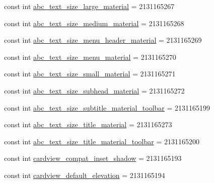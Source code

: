 \begin{DoxyCompactItemize}
\item 
const int \mbox{\hyperlink{class_f_w_p_s___app_1_1_droid_1_1_resource_1_1_dimension_a19d4f305b404ba1b44bd537cd5a9b904}{abc\+\_\+text\+\_\+size\+\_\+large\+\_\+material}} = 2131165267
\item 
const int \mbox{\hyperlink{class_f_w_p_s___app_1_1_droid_1_1_resource_1_1_dimension_a473caaf84c7cfc6a340ae52ab5ee6156}{abc\+\_\+text\+\_\+size\+\_\+medium\+\_\+material}} = 2131165268
\item 
const int \mbox{\hyperlink{class_f_w_p_s___app_1_1_droid_1_1_resource_1_1_dimension_a66dc6695f5a56e52f054871d0ae86be7}{abc\+\_\+text\+\_\+size\+\_\+menu\+\_\+header\+\_\+material}} = 2131165269
\item 
const int \mbox{\hyperlink{class_f_w_p_s___app_1_1_droid_1_1_resource_1_1_dimension_adf8e03d41a36e2981f59e41670bd602e}{abc\+\_\+text\+\_\+size\+\_\+menu\+\_\+material}} = 2131165270
\item 
const int \mbox{\hyperlink{class_f_w_p_s___app_1_1_droid_1_1_resource_1_1_dimension_ac37e1adcdb4c2ea54770ff5ec9eb1b7d}{abc\+\_\+text\+\_\+size\+\_\+small\+\_\+material}} = 2131165271
\item 
const int \mbox{\hyperlink{class_f_w_p_s___app_1_1_droid_1_1_resource_1_1_dimension_addf92e93a82f6d4d7f834b51ec119413}{abc\+\_\+text\+\_\+size\+\_\+subhead\+\_\+material}} = 2131165272
\item 
const int \mbox{\hyperlink{class_f_w_p_s___app_1_1_droid_1_1_resource_1_1_dimension_aae45b35dcb2a9fcc16fb028b22657460}{abc\+\_\+text\+\_\+size\+\_\+subtitle\+\_\+material\+\_\+toolbar}} = 2131165199
\item 
const int \mbox{\hyperlink{class_f_w_p_s___app_1_1_droid_1_1_resource_1_1_dimension_a04ff00d55fc590a23c3d3740cf75e075}{abc\+\_\+text\+\_\+size\+\_\+title\+\_\+material}} = 2131165273
\item 
const int \mbox{\hyperlink{class_f_w_p_s___app_1_1_droid_1_1_resource_1_1_dimension_aecaa3231886bcf6b1fbc7db50cb75beb}{abc\+\_\+text\+\_\+size\+\_\+title\+\_\+material\+\_\+toolbar}} = 2131165200
\item 
const int \mbox{\hyperlink{class_f_w_p_s___app_1_1_droid_1_1_resource_1_1_dimension_a484451c77631ec58a4753920c9e4b83f}{cardview\+\_\+compat\+\_\+inset\+\_\+shadow}} = 2131165193
\item 
const int \mbox{\hyperlink{class_f_w_p_s___app_1_1_droid_1_1_resource_1_1_dimension_a49cc228f3c7144f23f068dc1d406cd48}{cardview\+\_\+default\+\_\+elevation}} = 2131165194
\item 

\end{DoxyCompactItemize}
